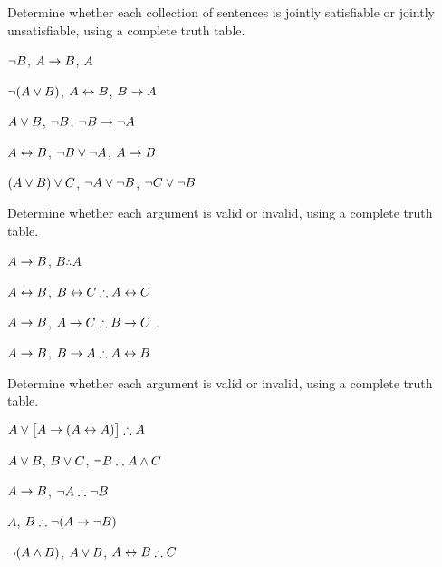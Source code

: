 \noindent\problempart
\label{pr.TT.satisfiable3}
Determine whether each collection of sentences is jointly satisfiable or jointly unsatisfiable, using a complete truth table.
\begin{compactlist}
\item $\neg B$, $A \rightarrow B$, $A$ \vspace{.5ex} \hfill {}
\item $\neg(A \vee B)$, $A \leftrightarrow B$, $B \rightarrow A$\vspace{.5ex} \hfill {}
\item $A \vee B$, $\neg B$, $\neg B \rightarrow \neg A$\vspace{.5ex} \hfill {}
\item $A \leftrightarrow B$, $\neg B \vee \neg A$, $A \rightarrow B$\vspace{.5ex} \hfill {} 
\item $(A \vee B) \vee C$, $\neg A \vee \neg B$, $\neg C \vee \neg B$\vspace{.5ex} \hfill {}
\end{compactlist}

\noindent\problempart
\label{pr.TT.valid2}
Determine whether each argument is valid or invalid, using a complete truth table.
\begin{compactlist}
\item $A\rightarrow B$, $B \therefore  A$ \hfill {}

\item $A\leftrightarrow B$, $B\eiff C \therefore A\eiff C$ \hfill {}

\item $A \rightarrow B$, $A \eif C\therefore B \eif C$ \hfill {}.

\item $A \rightarrow B$, $B \eif A\therefore A \eiff B$ \hfill {} 
\end{compactlist}

\noindent\problempart
\label{pr.TT.valid3}
Determine whether each argument is valid or invalid, using a complete truth table.
\begin{compactlist}
\item $A\eor\bigl[A\eif(A\eiff A)\bigr] \therefore  A $\vspace{.5ex} \hfill {}
\item $A\vee B$, $B\vee C$, $\enot B \therefore A \eand C$\vspace{.5ex} \hfill {}
\item $A \rightarrow B$, $\enot A\therefore \enot B$ \vspace{.5ex} \hfill {}
\item $A$, $B\therefore \enot(A\eif \enot B)$ \vspace{.5ex} \hfill {}
\item $\neg(A \wedge B)$, $A \vee B$, $A \eiff B\therefore C$ \vspace{.5ex} \hfill {}
\end{compactlist}


